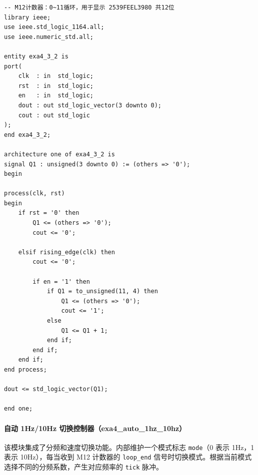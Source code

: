 \documentclass[12pt]{ctexart}
\begin{document}
\begin{verbatim}
-- M12计数器：0~11循环，用于显示 2539FEEL3980 共12位
library ieee;
use ieee.std_logic_1164.all;
use ieee.numeric_std.all;

entity exa4_3_2 is
port(
    clk  : in  std_logic;
    rst  : in  std_logic;
    en   : in  std_logic;
    dout : out std_logic_vector(3 downto 0);
    cout : out std_logic
);
end exa4_3_2;

architecture one of exa4_3_2 is
signal Q1 : unsigned(3 downto 0) := (others => '0');
begin

process(clk, rst)
begin
    if rst = '0' then
        Q1 <= (others => '0');
        cout <= '0';

    elsif rising_edge(clk) then
        cout <= '0';

        if en = '1' then
            if Q1 = to_unsigned(11, 4) then
                Q1 <= (others => '0');
                cout <= '1';
            else
                Q1 <= Q1 + 1;
            end if;
        end if;
    end if;
end process;

dout <= std_logic_vector(Q1);

end one;
\end{verbatim}
\label{lst:counter2}

\paragraph{自动 1Hz/10Hz 切换控制器（exa4\_auto\_1hz\_10hz）}

该模块集成了分频和速度切换功能。内部维护一个模式标志 \texttt{mode}（0 表示 1Hz，1 表示 10Hz），每当收到 M12 计数器的 \texttt{loop\_end} 信号时切换模式。根据当前模式选择不同的分频系数，产生对应频率的 \texttt{tick} 脉冲。
\end{document}

